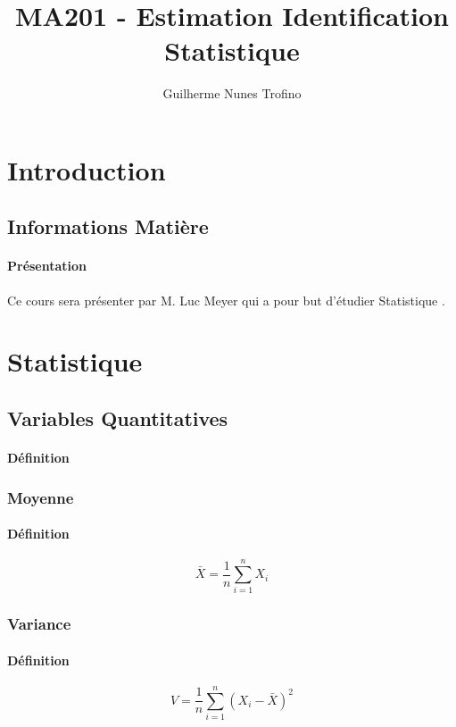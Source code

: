 \documentclass{article}
\title{MA201 - Estimation Identification Statistique}
\author{Guilherme Nunes Trofino}
\begin{document}
\maketitle

\newpage\tableofcontents

\section{Introduction}



\subsection{Informations Matière}
\paragraph{Présentation}Ce cours sera présenter par M. Luc Meyer qui a pour but d'étudier Statistique .


\section{Statistique}
\subsection{Variables Quantitatives}
\paragraph{Définition}

\subsubsection{Moyenne}
\paragraph{Définition}
\begin{equation}
    \boxed{
        \bar{X} = \frac{1}{n} \sum^{n}_{i=1} X_{i}
    }
\end{equation}

\subsubsection{Variance}
\paragraph{Définition}
\begin{equation}
    \boxed{
        V = \frac{1}{n} \sum^{n}_{i=1} (X_{i} - \bar{X})^{2}
    }
\end{equation}
\end{document}
